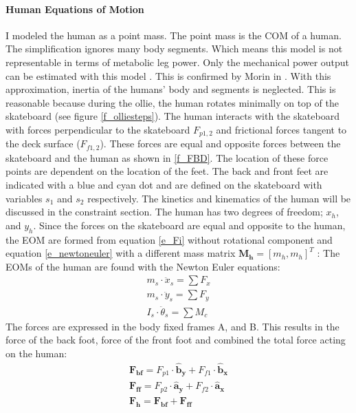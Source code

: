 \paragraph{Human Equations of Motion}
\noindent I modeled the human as a point mass. The point mass is the COM of a human. The simplification ignores many body segments. Which means this model is not representable in terms of metabolic leg power. Only the mechanical power output can be estimated with this model \cite{van_der_kruk_power_2018}. This is confirmed by Morin in \cite{morin_biomechanics_2018}. With this approximation, inertia of the humans' body and segments is neglected. This is reasonable because during the ollie, the human rotates minimally on top of the skateboard (see figure \ref{f_olliesteps}). The human interacts with the skateboard with forces perpendicular to the skateboard $F_{p1,2}$ and frictional forces tangent to the deck surface ($F_{f1,2}$). These forces are equal and opposite forces between the skateboard and the human as shown in \ref{f_FBD}. The location of these force points are dependent on the location of the feet. The back and front feet are indicated with a blue and cyan dot and are defined on the skateboard with variables $s_1$ and $s_2$ respectively. The kinetics and kinematics of the human will be discussed in the constraint section. The human has two degrees of freedom; $x_h$, and $y_h$. Since the forces on the skateboard are equal and opposite to the human, the EOM are formed from equation \ref{e_Fi} without rotational component and equation \ref{e_newtoneuler} with a different mass matrix $\mathbf{M_h} = [m_h, m_h]^T$ :
The EOMs of the human are found with the Newton Euler equations:
\begin{equation}\label{e_newtoneuler}
\begin{array}{c}
        m_s \cdot \ddot x_s = \sum F_x  \\
        m_s \cdot \ddot y_s = \sum F_y  \\
        I_s \cdot \ddot \theta_s = \sum M_c
    \end{array}
\end{equation}
The forces are expressed in the body fixed frames A, and B. This results in the force of the back foot, force of the front foot and combined the total force acting on the human:
\begin{equation} \label{e_humanforce}
\begin{array}{cc}
      \mathbf{F_{bf}} = F_{p1} \cdot \mathbf{\hat b_y} + F_{f1} \cdot \mathbf{\hat b_x}\\
      \mathbf{F_{ff}} = F_{p2} \cdot \mathbf{\hat a_y} + F_{f2} \cdot \mathbf{\hat a_x}\\
      \mathbf{F_h}    = \mathbf{F_{bf}} + \mathbf{F_{ff}}
\end{array}
\end{equation}
